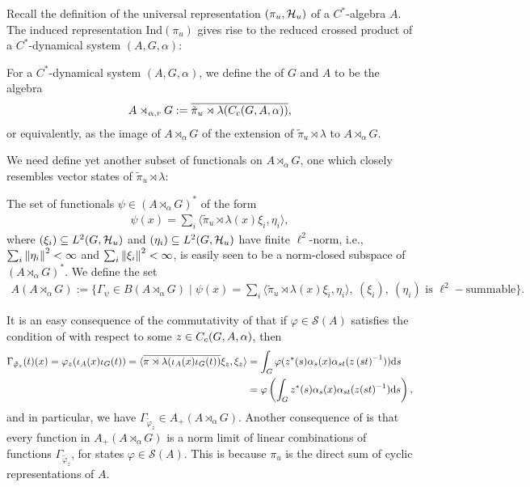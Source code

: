 Recall the definition of the universal representation $(\pi_u,\mathcal{H}_u)$ of a $C^*$-algebra $A$. The induced representation $\mathrm{Ind}(\pi_u)$ gives rise to the reduced crossed product of a $C^*$-dynamical system $(A,G,\alpha)$:
\begin{definition}
	For a $C^*$-dynamical system $(A,G,\alpha)$, we define the  of $G$ and $A$ to be the algebra
	\begin{align*}
		A \rtimes_{\alpha,r} G := \overline{\tilde \pi_u \rtimes \lambda (C_c(G,A,\alpha))},
	\end{align*}
	or equivalently, as the image of $A \rtimes_\alpha G$ of the extension of $\tilde \pi_u \rtimes \lambda$ to $A \rtimes_\alpha G$. 
\end{definition}

We need define yet another subset of functionals on $A \rtimes_\alpha G$, one which closely resembles vector states of $\tilde \pi_u \rtimes \lambda$:
\begin{definition}
	The set of functionals $\psi \in (A \rtimes_\alpha G)^*$ of the form
	\begin{align*}
		\psi(x) = \sum_{i} \langle \tilde \pi_u \rtimes \lambda (x) \xi_i , \eta_i\rangle,
	\end{align*}
	where $(\xi_i)\subseteq L^2(G,\mathcal{H}_u)$ and $(\eta_i) \subseteq L^2(G,\mathcal{H}_u)$ have finite $\ell^2$-norm, i.e., $ \sum_i \left\lVert \eta_i\right\rVert^2 < \infty$ and $\sum_{i} \left\lVert \xi_i \right\rVert^2 < \infty$, is easily seen to be a norm-closed subspace of $(A \rtimes_\alpha G)^*$. We define the set 
	\begin{align*}
		A(A \rtimes_\alpha G) := \{\Gamma_\psi \in B(A \rtimes_\alpha G) \mid \psi(x) = \sum_{i} \langle \tilde \pi_u \rtimes \lambda(x) \xi_i , \eta_i \rangle , \ (\xi_i), \ (\eta_i) \text{ is } \ell^2-\text{summable}\}.
	\end{align*}
\end{definition}
\begin{remark}
	It is an easy consequence of the commutativity of  that if $\varphi \in \mathcal{S}(A)$ satisfies the condition of  with respect to some $z \in C_c(G,A,\alpha)$, then 
\begin{align*}
	\Gamma_{\tilde \varphi_z}(t)(x) = \varphi_z(\iota_A(x)  \iota_G(t)) = \langle \overline{\pi \rtimes \lambda(\iota_A(x) \iota_G(t))} \xi_z , \xi_z\rangle & = \int_G \varphi(z^*(s)\alpha_s(x)\alpha_{st}(z\left( st \right)^{-1})) \mathrm{d} s \\
	&= \varphi\left( \int_G z^*(s) \alpha_s(x) \alpha_{st}(z(st)^{-1})\mathrm{d} s \right),
\end{align*}
and in particular, we have $\Gamma_{\tilde \varphi_z} \in A_+(A \rtimes_\alpha G)$. Another consequence of  is that every function in $A_+(A \rtimes_\alpha G)$ is a norm limit of linear combinations of functions $\Gamma_{\tilde \varphi_z}$, for states $\varphi \in \mathcal{S}(A)$. This is because $\pi_u$ is the direct sum of cyclic representations of $A$.
\end{remark}
